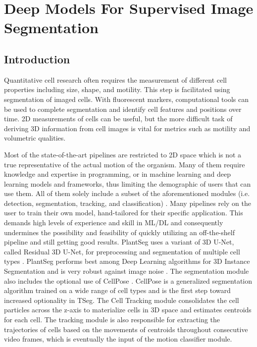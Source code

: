 \documentclass[./dissertation.tex]{subfiles}
\begin{document}
\chapter{Deep Models For Supervised Image Segmentation}

\section{Introduction}
Quantitative cell research often requires the measurement of different cell properties including size, shape, and motility. This step is facilitated using segmentation of imaged cells. With fluorescent markers, computational tools can be used to complete segmentation and identify cell features and positions over time. 2D measurements of cells can be useful, but the more difficult task of deriving 3D information from cell images is vital for metrics such as motility and volumetric qualities.

Most of the state-of-the-art pipelines are restricted to 2D space which is not a true representative of the actual motion of the organism. Many of them require knowledge and expertise in programming, or in machine learning and deep learning models and frameworks, thus limiting the demographic of users that can use them. All of them solely include a subset of the aforementioned modules (i.e. detection, segmentation, tracking, and classification) \cite{stringer2021cellpose}. Many pipelines rely on the user to train their own model, hand-tailored for their specific application. This demands high levels of experience and skill in ML/DL and consequently undermines the possibility and feasibility of quickly utilizing an off-the-shelf pipeline and still getting good results. PlantSeg uses a variant of 3D U-Net, called Residual 3D U-Net, for preprocessing and segmentation of multiple cell types \cite{plantseg}. PlantSeg performs best among Deep Learning algorithms for 3D Instance Segmentation and is very robust against image noise \cite{Kar2021.06.09.447748}. The segmentation module also includes the optional use of CellPose \cite{stringer2021cellpose}. CellPose is a generalized segmentation algorithm trained on a wide range of cell types and is the first step toward increased optionality in TSeg. The Cell Tracking module consolidates the cell particles across the z-axis to materialize cells in 3D space and estimates centroids for each cell. The tracking module is also responsible for extracting the trajectories of cells based on the movements of centroids throughout consecutive video frames, which is eventually the input of the motion classifier module.
\end{document}
